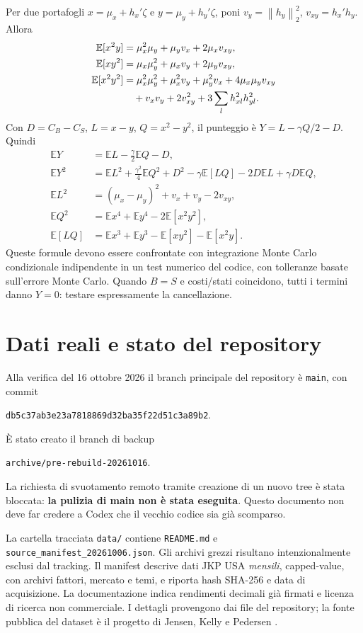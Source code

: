 \documentclass[11pt,a4paper]{article}
\theoremstyle{definition}\newtheorem{definition}[theorem]{Definizione}
\theoremstyle{remark}\newtheorem{remark}[theorem]{Osservazione}
\newcommand{\E}{\mathbb E}\newcommand{\PP}{\mathbb P}\newcommand{\R}{\mathbb R}
\newcommand{\norm}[1]{\left\lVert#1\right\rVert}\newcommand{\abs}[1]{\left|#1\right|}
\begin{document}
Per due portafogli $x=\mu_x+h_x'\zeta$ e $y=\mu_y+h_y'\zeta$, poni $v_y=\norm{h_y}_2^2$, $v_{xy}=h_x'h_y$. Allora
\begin{align}
 \E[x^2y]&=\mu_x^2\mu_y+\mu_yv_x+2\mu_xv_{xy},\\
 \E[xy^2]&=\mu_x\mu_y^2+\mu_xv_y+2\mu_yv_{xy},\\
 \E[x^2y^2]&=\mu_x^2\mu_y^2+\mu_x^2v_y+\mu_y^2v_x+4\mu_x\mu_yv_{xy}\notag\\
 &\quad+v_xv_y+2v_{xy}^2+3\sum_lh_{xl}^2h_{yl}^2.
\end{align}
Con $D=C_B-C_S$, $L=x-y$, $Q=x^2-y^2$, il punteggio è $Y=L-\gamma Q/2-D$. Quindi
\begin{align}
 \E Y&=\E L-\frac\gamma2\E Q-D,\\
 \E Y^2&=\E L^2+\frac{\gamma^2}{4}\E Q^2+D^2
 -\gamma\E[LQ]-2D\E L+\gamma D\E Q,\\
 \E L^2&=(\mu_x-\mu_y)^2+v_x+v_y-2v_{xy},\\
 \E Q^2&=\E x^4+\E y^4-2\E[x^2y^2],\\
 \E[LQ]&=\E x^3+\E y^3-\E[xy^2]-\E[x^2y].
\end{align}
Queste formule devono essere confrontate con integrazione Monte Carlo condizionale indipendente in un test numerico del codice, con tolleranze basate sull'errore Monte Carlo. Quando $B=S$ e costi/stati coincidono, tutti i termini danno $Y=0$: testare espressamente la cancellazione.

\section{Dati reali e stato del repository}
\label{sec:repository}
Alla verifica del 16 ottobre 2026 il branch principale del repository è \texttt{main}, con commit
\begin{center}\texttt{db5c37ab3e23a7818869d32ba35f22d51c3a89b2}.\end{center}
È stato creato il branch di backup
\begin{center}\texttt{archive/pre-rebuild-20261016}.\end{center}
La richiesta di svuotamento remoto tramite creazione di un nuovo tree è stata bloccata: \textbf{la pulizia di main non è stata eseguita}. Questo documento non deve far credere a Codex che il vecchio codice sia già scomparso.

La cartella tracciata \texttt{data/} contiene \texttt{README.md} e \texttt{source\_manifest\_20261006.json}. Gli archivi grezzi risultano intenzionalmente esclusi dal tracking. Il manifest descrive dati JKP USA \emph{mensili}, capped-value, con archivi fattori, mercato e temi, e riporta hash SHA-256 e data di acquisizione. La documentazione indica rendimenti decimali già firmati e licenza di ricerca non commerciale. I dettagli provengono dai file del repository; la fonte pubblica del dataset è il progetto di Jensen, Kelly e Pedersen \cite{jkp}.
\end{document}
